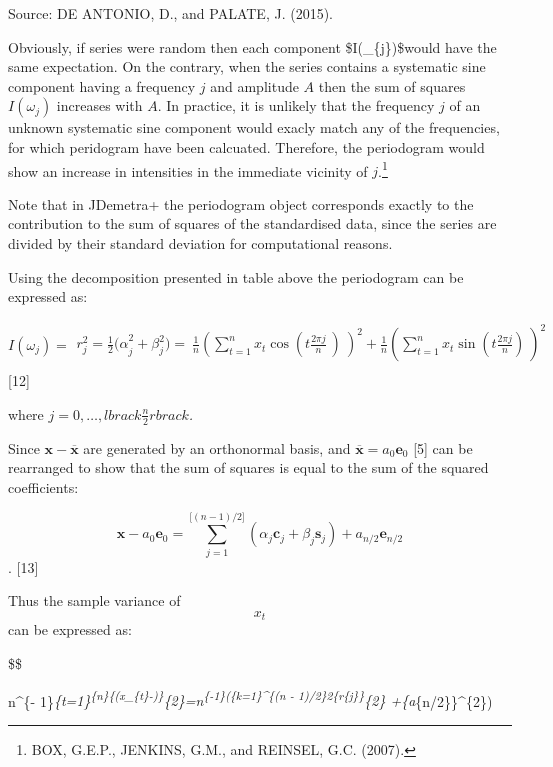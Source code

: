 \documentclass[
  letterpaper,
  DIV=11,
  numbers=noendperiod]{scrreprt}
\begin{document}
Source: DE ANTONIO, D., and PALATE, J. (2015).

Obviously, if series were random then each component
\$I(\omega\_\{j\})\$would have the same expectation. On the contrary,
when the series contains a systematic sine component having a frequency
\(j\) and amplitude \(A\) then the sum of squares \(I(\omega_{j})\)
increases with \(A\). In practice, it is unlikely that the frequency
\(j\) of an unknown systematic sine component would exacly match any of
the frequencies, for which peridogram have been calcuated. Therefore,
the periodogram would show an increase in intensities in the immediate
vicinity of \(j\).\footnote{BOX, G.E.P., JENKINS, G.M., and REINSEL,
  G.C. (2007).}

Note that in JDemetra+ the periodogram object corresponds exactly to the
contribution to the sum of squares of the standardised data, since the
series are divided by their standard deviation for computational
reasons.

Using the decomposition presented in table above the periodogram can be
expressed as:

\[
I(\omega_{j})\mathbf{=}\begin{matrix}                                                                                r_{j}^{2} = \frac{1}{2}{(\alpha}_{j}^{2} + \beta_{j}^{2}) = \ {\frac{1}{n}(\sum_{t = 1}^{n}{x_{t}\cos{( {t\frac{2\pi j}{n}}_{\ })\ }})}^{2} + \frac{1}{n}(\sum_{t = 1}^{n}{x_{t}\sin( t\frac{2\pi j}{n})_{\ }})^{2} \\   
\end{matrix}
\] {[}12{]}

where \(j = 0,\ldots,lbrack \frac{n}{2} rbrack\)\emph{.}

Since \(\mathbf{x} - \overline{\mathbf{x}}\) are generated by an
orthonormal basis, and
\(\overline{\mathbf{x}}\mathbf{=}a_{0}\mathbf{e}_{0}\) {[}5{]} can be
rearranged to show that the sum of squares is equal to the sum of the
squared coefficients:

\[
 \mathbf{x} - a_{0}\mathbf{e}_{0} =\sum_{j=1}^{\lbrack(n - 1)/2\rbrack}(\alpha_{j}\mathbf{c}_{j}+\beta_{j}\mathbf{s}_{j}) + a_{n/2}\mathbf{e}_{n/2}
 \]. {[}13{]}

Thus the sample variance of \[x_{t}\] can be expressed as:

\$\$

n\^{}\{-
1\}\sum\emph{\{t=1\}\textsuperscript{\{n\}\{(x\_\{t\}-)\}}\{2\}=n\textsuperscript{\{-1\}(\sum\emph{\{k=1\}\^{}\{\lbrack(n
- 1)/2\rbrack\}2\{r}\{j\}\}}\{2\} +\{a}\{n/2\}\}\^{}\{2\})
\end{document}
